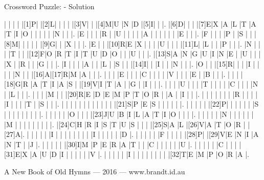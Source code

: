 \documentclass[12pt]{article}
\begin{document}
\begin{center}
  \huge{Crossword Puzzle: - Solution}
\end{center}
\vspace{1.5cm}
\PuzzleSolution
\begin{Puzzle}{22}{25}
  |{}  |{}  |{}  |{}  |[1]P|{}  |[2]L|{}  |{}  |{}  |{}  |[3]V|{}  |{}  |[4]M|U   |N   |D   |[5]I|{}  |{}  |.
  |[6]D|{}  |{}  |{}  |[7]E|X   |A   |L   |T   |A   |T   |I   |O   |{}  |{}  |{}  |{}  |{}  |N   |{}  |{}  |.
  |E   |{}  |{}  |{}  |R   |{}  |U   |{}  |{}  |{}  |{}  |A   |{}  |{}  |{}  |{}  |{}  |{}  |E   |{}  |{}  |.
  |F   |{}  |{}  |{}  |P   |{}  |S   |{}  |{}  |[8]M|{}  |{}  |{}  |{}  |{}  |[9]G|{}  |{}  |X   |{}  |{}  |.
  |E   |{}  |{}  |[10]R|E   |X   |{}  |{}  |{}  |U   |{}  |{}  |{}  |[11]L|{}  |L   |{}  |{}  |P   |{}  |{}  |.
  |N   |{}  |{}  |{}  |T   |{}  |{}  |[12]F|O   |R   |T   |I   |T   |U   |D   |O   |{}  |{}  |U   |{}  |{}  |.
  |[13]S|A   |N   |G   |U   |I   |N   |E   |{}  |U   |{}  |{}  |{}  |X   |{}  |R   |{}  |{}  |G   |{}  |{}  |.
  |I   |{}  |{}  |{}  |A   |{}  |{}  |L   |{}  |S   |{}  |{}  |[14]I|{}  |{}  |I   |{}  |{}  |N   |{}  |{}  |.
  |O   |{}  |{}  |[15]R|{}  |{}  |{}  |I   |{}  |{}  |{}  |{}  |N   |{}  |{}  |[16]A|[17]R|M   |A   |{}  |{}  |.
  |{}  |{}  |{}  |E   |{}  |{}  |{}  |C   |{}  |{}  |{}  |{}  |V   |{}  |{}  |{}  |E   |{}  |B   |{}  |{}  |.
  |{}  |{}  |{}  |[18]G|R   |A   |T   |I   |A   |S   |{}  |[19]V|I   |T   |A   |{}  |G   |{}  |I   |{}  |{}  |.
  |{}  |{}  |{}  |U   |{}  |{}  |{}  |T   |{}  |{}  |{}  |{}  |C   |{}  |{}  |{}  |N   |{}  |L   |{}  |{}  |.
  |{}  |{}  |{}  |M   |{}  |{}  |[20]R|E   |D   |E   |M   |P   |T   |O   |R   |{}  |A   |{}  |I   |{}  |{}  |.
  |{}  |{}  |{}  |{}  |{}  |{}  |{}  |R   |{}  |{}  |{}  |{}  |I   |{}  |{}  |{}  |T   |{}  |S   |{}  |{}  |.
  |{}  |{}  |{}  |{}  |{}  |{}  |{}  |{}  |{}  |{}  |{}  |{}  |[21]S|P   |E   |S   |{}  |{}  |{}  |{}  |{}  |.
  |{}  |{}  |{}  |{}  |{}  |[22]P|{}  |{}  |{}  |{}  |{}  |{}  |S   |{}  |{}  |{}  |{}  |{}  |{}  |{}  |{}  |.
  |{}  |{}  |{}  |{}  |{}  |O   |{}  |{}  |{}  |[23]J|U   |B   |I   |L   |A   |T   |I   |O   |{}  |{}  |{}  |.
  |{}  |{}  |{}  |{}  |{}  |N   |{}  |{}  |{}  |{}  |{}  |{}  |M   |{}  |{}  |{}  |{}  |{}  |{}  |{}  |{}  |.
  |[24]C|H   |R   |I   |S   |T   |U   |S   |{}  |{}  |{}  |[25]S|A   |L   |[26]V|A   |T   |O   |R   |{}  |[27]A|.
  |{}  |{}  |{}  |{}  |{}  |I   |{}  |{}  |{}  |{}  |{}  |{}  |{}  |{}  |I   |{}  |{}  |{}  |{}  |{}  |D   |.
  |{}  |{}  |{}  |{}  |{}  |F   |{}  |{}  |{}  |{}  |[28]P|{}  |[29]V|E   |N   |I   |A   |N   |T   |{}  |J   |.
  |{}  |{}  |{}  |{}  |{}  |[30]I|M   |P   |E   |R   |A   |T   |{}  |{}  |C   |{}  |{}  |{}  |{}  |{}  |U   |.
  |{}  |{}  |{}  |{}  |{}  |C   |{}  |{}  |{}  |[31]E|X   |A   |U   |D   |I   |{}  |{}  |{}  |{}  |{}  |V   |.
  |{}  |{}  |{}  |{}  |{}  |I   |{}  |{}  |{}  |{}  |{}  |{}  |{}  |{}  |[32]T|E   |M   |P   |O   |R   |A   |.
\end{Puzzle}

\bigskip

\vfill

\centerline{A New Book of Old Hymns --- 2016 --- www.brandt.id.au}
\eject
\end{document}
